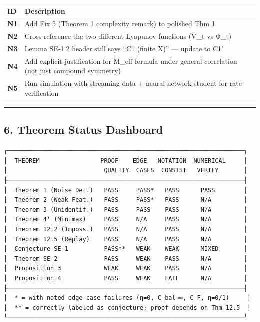 \documentclass[
  12pt,
]{ctexart}
\begin{document}
\begin{longtable}[]{@{}
  >{\raggedright\arraybackslash}p{}
  >{\raggedright\arraybackslash}p{}@{}}
\toprule\noalign{}
\begin{minipage}[b]{\linewidth}\raggedright
ID
\end{minipage} & \begin{minipage}[b]{\linewidth}\raggedright
Description
\end{minipage} \\
\midrule\noalign{}
\endhead
\bottomrule\noalign{}
\endlastfoot
\textbf{N1} & Add Fix 5 (Theorem 1 complexity remark) to polished Thm
1 \\
\textbf{N2} & Cross-reference the two different Lyapunov functions (V\_t
vs Φ\_t) \\
\textbf{N3} & Lemma SE-1.2 header still says ``C1 (finite X)'' ---
update to C1' \\
\textbf{N4} & Add explicit justification for M\_eff formula under
general correlation (not just compound symmetry) \\
\textbf{N5} & Run simulation with streaming data + neural network
student for rate verification \\
\end{longtable}

\begin{center}\rule{0.5\linewidth}{0.5pt}\end{center}

\subsection{6. Theorem Status Dashboard}\label{theorem-status-dashboard}

\begin{verbatim}
┌──────────────────────────────────────────────────────────────────┐
│  THEOREM                 PROOF    EDGE   NOTATION  NUMERICAL     │
│                           QUALITY  CASES  CONSIST   VERIFY       │
├──────────────────────────────────────────────────────────────────┤
│  Theorem 1 (Noise Det.)   PASS     PASS*   PASS      PASS        │
│  Theorem 2 (Weak Feat.)   PASS     PASS*   PASS      N/A         │
│  Theorem 3 (Unidentif.)   PASS     PASS    PASS      N/A         │
│  Theorem 4' (Minimax)     PASS     N/A     PASS      N/A         │
│  Theorem 12.2 (Imposs.)   PASS     N/A     PASS      N/A         │
│  Theorem 12.5 (Replay)    PASS     N/A     PASS      N/A         │
│  Conjecture SE-1          PASS**   WEAK    WEAK      MIXED       │
│  Theorem SE-2             PASS     WEAK    PASS      N/A         │
│  Proposition 3            WEAK     WEAK    PASS      N/A         │
│  Proposition 4            PASS     WEAK    FAIL      N/A         │
├──────────────────────────────────────────────────────────────────┤
│  * = with noted edge-case failures (η=0, C_bal→∞, C_F, η=0/1)     │
│  ** = correctly labeled as conjecture; proof depends on Thm 12.5  │
└──────────────────────────────────────────────────────────────────┘
\end{verbatim}
\end{document}
